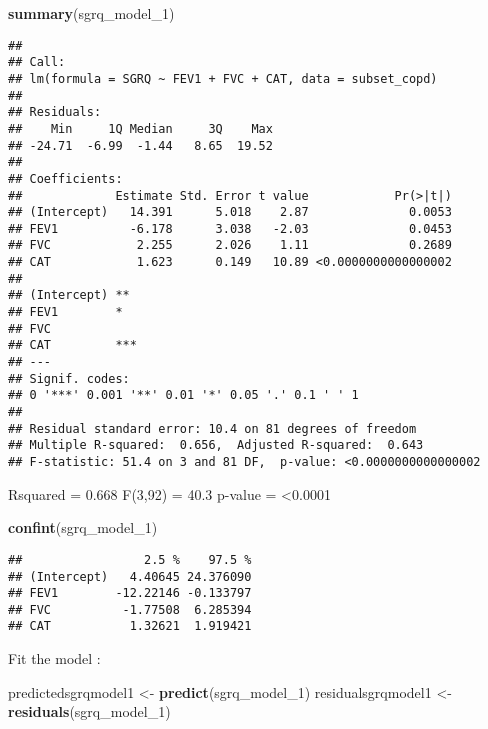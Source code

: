 \documentclass[
]{article}
\newenvironment{Shaded}{\begin{snugshade}}{\end{snugshade}}
\newcommand{\FunctionTok}[1]{\textcolor[rgb]{0.13,0.29,0.53}{\textbf{#1}}}
\newcommand{\NormalTok}[1]{#1}
\newcommand{\OtherTok}[1]{\textcolor[rgb]{0.56,0.35,0.01}{#1}}
\begin{document}
\begin{Shaded}
\begin{Highlighting}[]
\FunctionTok{summary}\NormalTok{(sgrq\_model\_1)}
\end{Highlighting}
\end{Shaded}

\begin{verbatim}
## 
## Call:
## lm(formula = SGRQ ~ FEV1 + FVC + CAT, data = subset_copd)
## 
## Residuals:
##    Min     1Q Median     3Q    Max 
## -24.71  -6.99  -1.44   8.65  19.52 
## 
## Coefficients:
##             Estimate Std. Error t value            Pr(>|t|)
## (Intercept)   14.391      5.018    2.87              0.0053
## FEV1          -6.178      3.038   -2.03              0.0453
## FVC            2.255      2.026    1.11              0.2689
## CAT            1.623      0.149   10.89 <0.0000000000000002
##                
## (Intercept) ** 
## FEV1        *  
## FVC            
## CAT         ***
## ---
## Signif. codes:  
## 0 '***' 0.001 '**' 0.01 '*' 0.05 '.' 0.1 ' ' 1
## 
## Residual standard error: 10.4 on 81 degrees of freedom
## Multiple R-squared:  0.656,  Adjusted R-squared:  0.643 
## F-statistic: 51.4 on 3 and 81 DF,  p-value: <0.0000000000000002
\end{verbatim}

Rsquared = 0.668 F(3,92) = 40.3 p-value = \textless0.0001

\begin{Shaded}
\begin{Highlighting}[]
\FunctionTok{confint}\NormalTok{(sgrq\_model\_1)}
\end{Highlighting}
\end{Shaded}

\begin{verbatim}
##                 2.5 %    97.5 %
## (Intercept)   4.40645 24.376090
## FEV1        -12.22146 -0.133797
## FVC          -1.77508  6.285394
## CAT           1.32621  1.919421
\end{verbatim}

Fit the model :

\begin{Shaded}
\begin{Highlighting}[]
\NormalTok{predictedsgrqmodel1 }\OtherTok{\textless{}{-}} \FunctionTok{predict}\NormalTok{(sgrq\_model\_1)}
\NormalTok{residualsgrqmodel1 }\OtherTok{\textless{}{-}} \FunctionTok{residuals}\NormalTok{(sgrq\_model\_1)}
\end{Highlighting}
\end{Shaded}
\end{document}
